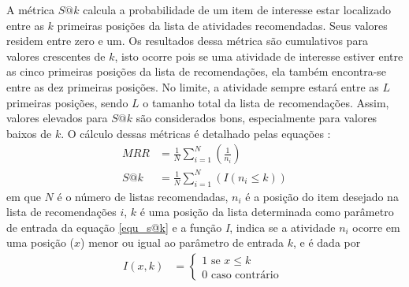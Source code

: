A métrica \(S@k\) calcula a probabilidade de um item de interesse estar localizado entre as \(k\) primeiras posições da lista de atividades recomendadas. Seus valores residem entre zero e um. Os resultados dessa métrica são cumulativos para valores crescentes de \(k\), isto ocorre pois se uma atividade de interesse estiver entre as cinco primeiras posições da lista de recomendações, ela também encontra-se entre as dez primeiras posições. No limite, a atividade sempre estará entre as \(L\) primeiras posições, sendo \(L\) o tamanho total da lista de recomendações. Assim, valores elevados para $S@k$ são considerados bons, especialmente para valores baixos de $k$. O cálculo dessas métricas é detalhado pelas equações \cite{Harvey2010}:
\begin{align}
MRR &= \frac{1}{N} \sum\limits_{i=1}^{N} \left( \frac{1}{n_{i}} \right) 		\label{equ_mrr}\\
S@k &= \frac{1}{N} \sum\limits_{i=1}^{N} \left( I(n_{i} \leq k) \right)			\label{equ_s@k}
\end{align}
em que \(N\) é o número de listas recomendadas, \(n_{i}\) é a posição do item desejado na lista de recomendações \(i\), \(k\) é uma posição da lista determinada como parâmetro de entrada da equação \eqref{equ_s@k} e a função \emph{I}, indica se a atividade \(n_{i}\) ocorre em uma posição (\(x\)) menor ou igual ao parâmetro de entrada \(k\), e é dada por
\begin{align}
I(x, k)   &= \begin{cases} \label{equ_indicativa}
1 \textrm{ se } x \leq k \\
0 \textrm{ caso contrário }
\end{cases}
\end{align}

